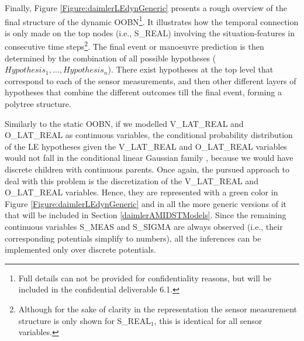 Finally, Figure \ref{Figure:daimlerLEdynGeneric} presents a rough overview of the final structure of the dynamic OOBN\footnote{Full details can not be provided for confidentiality reasons, but will be included in the confidential deliverable 6.1.}. It illustrates how the temporal connection is only made on the top nodes (i.e., S\_REAL) involving the situation-features in consecutive time steps\footnote{Although for the sake of clarity in the representation the sensor measurement structure is only shown for S\_REAL$_1$, this is identical for all sensor variables.}. The final event or manoeuvre prediction is then determined by the combination of all possible hypotheses ($Hypothesis_1, \ldots, Hypothesis_n$). There exist hypotheses at the top level that correspond to each of the sensor measurements, and then other different layers of hypotheses that combine the different outcomes till the final event, forming a polytree structure. %

Similarly to the static OOBN, if we modelled V\_LAT\_REAL and O\_LAT\_REAL as continuous variables, the conditional probability distribution of the LE hypotheses given the V\_LAT\_REAL and O\_LAT\_REAL variables would not fall in the conditional linear Gaussian family \cite{JensenNielsen2007}, because we would have discrete children with continuous parents. Once again, the pursued approach to deal with this problem is the discretization of the V\_LAT\_REAL and O\_LAT\_REAL variables. Hence, they are represented with a green color in Figure \ref{Figure:daimlerLEdynGeneric} and in all the more generic versions of it that will be included in Section \ref{daimlerAMIDSTModels}. Since the remaining continuous variables S\_MEAS and S\_SIGMA are always observed (i.e., their corresponding potentials simplify to numbers), all the inferences can be implemented only over discrete potentials.

